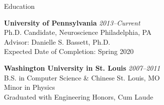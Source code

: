 \documentclass{resume} %
\begin{document}

\begin{rSection}{Education}

\textbf{University of Pennsylvania} \hfill \emph{2013--Current} \\
Ph.D. Candidate, Neuroscience \hfill Philadelphia, PA \\
Advisor: Danielle S. Bassett, Ph.D. \\
Expected Date of Completion: Spring 2020

\textbf{Washington University in St. Louis} \hfill \emph{2007--2011} \\
B.S. in Computer Science \& Chinese \hfill St. Louis, MO \\
Minor in Physics \\
Graduated with Engineering Honors, Cum Laude

\end{rSection}

\end{document}
